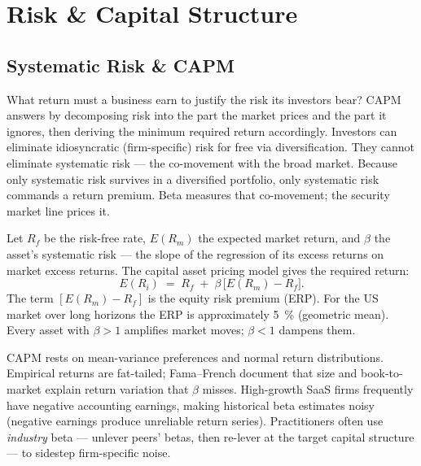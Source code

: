 \chapter{Risk \& Capital Structure}\label{ch:risk-and-capital-structure}


\section{Systematic Risk \& CAPM}\label{sec:capm}

What return must a business earn to justify the risk its investors bear? CAPM answers by
decomposing risk into the part the market prices and the part it ignores, then deriving the
minimum required return accordingly. Investors can eliminate idiosyncratic (firm-specific)
risk for free via diversification. They cannot eliminate systematic risk --- the co-movement
with the broad market. Because only systematic risk survives in a diversified portfolio,
only systematic risk commands a return premium. Beta measures that co-movement; the security
market line prices it.

Let \(R_f\) be the risk-free rate, \(E(R_m)\) the expected market return, and \(\beta\)
the asset's systematic risk --- the slope of the regression of its excess returns on market
excess returns. The capital asset pricing model gives the required return:
\begin{equation}\label{eq:capm}
  E(R_i) \;=\; R_f \;+\; \beta\,\bigl[E(R_m)-R_f\bigr].
\end{equation}
The term \([E(R_m)-R_f]\) is the equity risk premium (ERP). For the US market over long
horizons the ERP is approximately \qty{5}{\percent} (geometric mean). Every asset with
\(\beta>1\) amplifies market moves; \(\beta<1\) dampens them.

CAPM rests on mean-variance preferences and normal return distributions. Empirical returns
are fat-tailed; Fama--French document that size and book-to-market explain return variation
that \(\beta\) misses. High-growth SaaS firms frequently have negative accounting earnings,
making historical beta estimates noisy (negative earnings produce unreliable return series).
Practitioners often use \emph{industry} beta --- unlever peers' betas, then re-lever at the
target capital structure --- to sidestep firm-specific noise.

